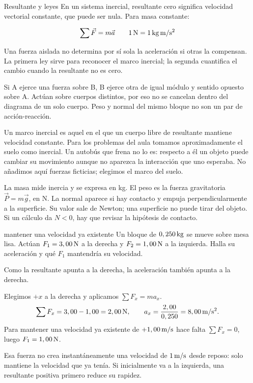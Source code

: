 \documentclass[11pt,a4paper]{article}
\begin{document}
\begin{lessoncard}{Resultante y leyes}
En un sistema inercial, resultante cero significa velocidad vectorial constante, que puede ser nula. Para masa constante:
\begin{formulabox}
\[
\sum \vec F=m\vec a \qquad 1\,\mathrm{N}=1\,\mathrm{kg}\,\mathrm{m/s^2}
\]
\end{formulabox}
Una fuerza aislada no determina por s\'i sola la aceleraci\'on si otras la compensan. La primera ley sirve para reconocer el marco inercial; la segunda cuantifica el cambio cuando la resultante no es cero.

Si A ejerce una fuerza sobre B, B ejerce otra de igual m\'odulo y sentido opuesto sobre A. Act\'uan sobre cuerpos distintos, por eso no se cancelan dentro del diagrama de un solo cuerpo. Peso y normal del mismo bloque no son un par de acci\'on-reacci\'on.
\end{lessoncard}

Un marco inercial es aquel en el que un cuerpo libre de resultante mantiene
velocidad constante. Para los problemas del aula tomamos aproximadamente el suelo
como inercial. Un autob\'us que frena no lo es: respecto a \'el un objeto puede
cambiar su movimiento aunque no aparezca la interacci\'on que uno esperaba.
No a\~nadimos aqu\'i fuerzas ficticias; elegimos el marco del suelo.

La masa mide inercia y se expresa en kg. El peso es la fuerza gravitatoria
$\vec P=m\vec g$, en N. La normal aparece si hay contacto y empuja perpendicularmente
a la superficie. Su valor sale de Newton; una superficie no puede tirar del objeto.
Si un c\'alculo da $N<0$, hay que revisar la hip\'otesis de contacto.

\begin{examplebox}{mantener una velocidad ya existente}
 Un bloque de $0,250\,\mathrm{kg}$ se mueve sobre mesa lisa. Act\'uan $F_1=3,00\,\mathrm{N}$ a la derecha y $F_2=1,00\,\mathrm{N}$ a la izquierda. Halla su aceleraci\'on y qu\'e $F_1$ mantendr\'ia su velocidad.
\solutionblock

 Como la resultante apunta a la derecha, la aceleraci\'on tambi\'en apunta a la derecha.

 Elegimos $+x$ a la derecha y aplicamos $\sum F_x=ma_x$.
\[
\sum F_x=3,00-1,00=2,00\,\mathrm{N},\qquad a_x=\frac{2,00}{0,250}=8,00\,\mathrm{m/s^2}.
\]
Para mantener una velocidad ya existente de $+1,00\,\mathrm{m/s}$ hace falta $\sum F_x=0$, luego $F_1=1,00\,\mathrm{N}$.

 Esa fuerza no crea instant\'aneamente una velocidad de $1\,\mathrm{m/s}$ desde reposo: solo mantiene la velocidad que ya ten\'ia. Si inicialmente va a la izquierda, una resultante positiva primero reduce su rapidez.
\end{examplebox}
\end{document}
